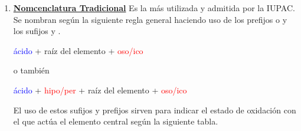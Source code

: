 \documentclass[11pt, a4paper]{article}
\begin{document}
\begin{enumerate}[label=\numberballgreen]
    \item \textbf{\uline{Nomcenclatura Tradicional}} Es la más utilizada y admitida por la IUPAC. Se nombran según la siguiente regla general haciendo uso de los prefijos  o  y los sufijos  y .
          \begin{center}
              \textcolor{blue}{ácido} + \textcolor{mygreen}{raíz del elemento} + \textcolor{red}{oso/ico}\par
              o también\par
              \textcolor{blue}{ácido} + \textcolor{red}{hipo/per} + \textcolor{mygreen}{raíz del elemento} + \textcolor{red}{oso/ico}
          \end{center}

          El uso de estos sufijos y prefijos sirven para indicar el estado de oxidación con el que actúa el elemento central según la siguiente tabla.


\end{enumerate}
\end{document}
